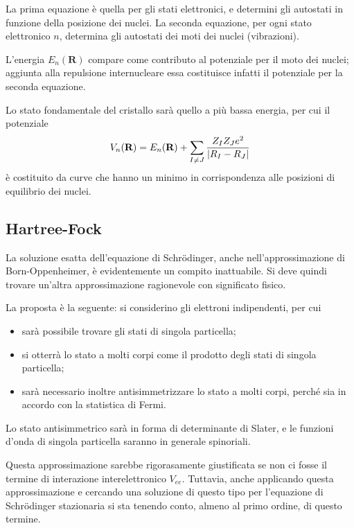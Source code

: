 La prima equazione è quella per gli stati elettronici, e determini gli autostati in funzione della posizione dei nuclei. La seconda equazione, per ogni stato elettronico $ n $, determina gli autostati dei moti dei nuclei (vibrazioni).

L'energia $ E_n(\textbf{R}) $ compare come contributo al potenziale per il moto dei nuclei; aggiunta alla repulsione internucleare essa costituisce infatti il potenziale per la seconda equazione.

Lo stato fondamentale del cristallo sarà quello a più bassa energia, per cui il potenziale
\[ V_n(\textbf{R}) = E_n(\textbf{R}) + \sum_{I \neq J} \frac{Z_I Z_J e^2}{\abs{R_I - R_J}} \]
è costituito da curve che hanno un minimo in corrispondenza alle posizioni di equilibrio dei nuclei.

\subsection{Hartree-Fock}

La soluzione esatta dell'equazione di Schrödinger, anche nell'approssimazione di Born-Oppenheimer, è evidentemente un compito inattuabile. Si deve quindi trovare un'altra approssimazione ragionevole con significato fisico.

La proposta è la seguente: si considerino gli elettroni indipendenti, per cui 
\begin{itemize}
	\item sarà possibile trovare gli stati di singola particella;
	\item si otterrà lo stato a molti corpi come il prodotto degli stati di singola particella;
	\item sarà necessario inoltre antisimmetrizzare lo stato a molti corpi, perché sia in accordo con la statistica di Fermi.
\end{itemize}
Lo stato antisimmetrico sarà in forma di determinante di Slater, e le funzioni d'onda di singola particella saranno in generale spinoriali.

Questa approssimazione sarebbe rigorasamente giustificata se non ci fosse il termine di interazione interelettronico $ V_{ee} $.
Tuttavia, anche applicando questa approssimazione e cercando una soluzione di questo tipo per l'equazione di Schrödinger stazionaria si sta tenendo conto, almeno al primo ordine, di questo termine.


